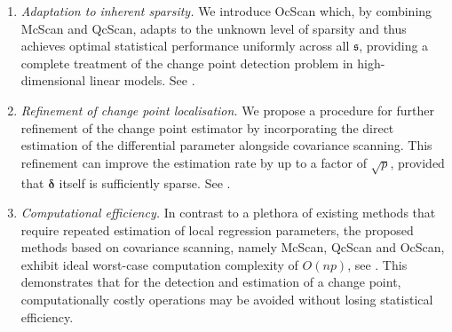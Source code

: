 \documentclass[11pt, a4paper]{article}
\theoremstyle{definition}
\theoremstyle{definition}
\theoremstyle{definition}
\theoremstyle{definition}
\theoremstyle{definition}
\theoremstyle{remark}
\theoremstyle{definition}
\theoremstyle{definition}
\theoremstyle{definition}
\begin{document}
\begin{enumerate}[label = (\roman*)]

\item \emph{Adaptation to inherent sparsity.} %
We introduce OcScan which, by combining McScan and QcScan, adapts to the unknown level of sparsity and thus achieves optimal statistical performance uniformly across all $\mathfrak{s}$, providing a complete treatment of the change point detection problem in high-dimensional linear models. See . 

\item \emph{Refinement of change point localisation.} We propose a procedure for further refinement of the change point estimator by incorporating the direct estimation of the differential parameter alongside covariance scanning. This refinement can improve the estimation rate by {up to a factor of $\sqrt p$}, provided that $\bm\delta$ itself is sufficiently sparse. See . 

\item \emph{Computational efficiency.} In contrast to a plethora of existing methods that require repeated estimation of local regression parameters, the proposed methods based on covariance scanning, namely McScan, QcScan and OcScan, exhibit ideal worst-case computation complexity of $O(np)$, see . 
This demonstrates that for the detection and estimation of a change point, computationally costly operations may be avoided without losing statistical efficiency. 
\end{enumerate}
\end{document}
